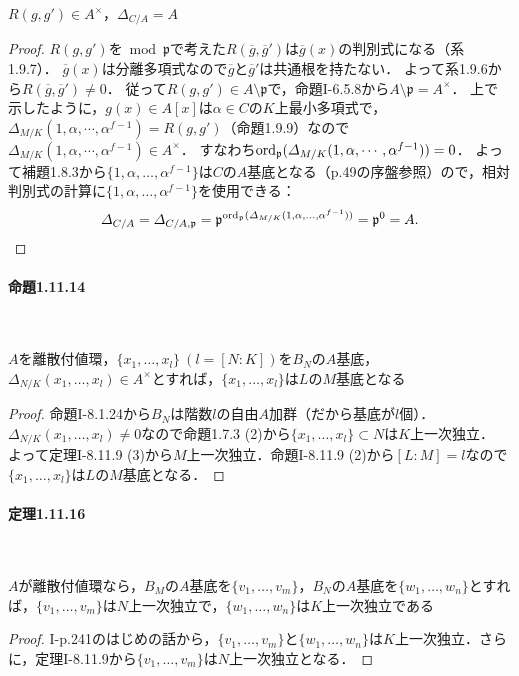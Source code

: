 \begin{screen}
  $R(g,g')\in A^\times$，$\varDelta_{C/A}=A$
\end{screen}
\begin{proof}
  $R(g,g')$を$\bmod\mathfrak{p}$で考えた$R(\overline{g},\overline{g}')$は$\overline{g}(x)$の判別式になる（系1.9.7）．
  $\overline{g}(x)$は分離多項式なので$\overline{g}$と$\overline{g}'$は共通根を持たない．
  よって系1.9.6から$R(\overline{g},\overline{g}')\neq 0$．
  従って$R(g,g')\in A\setminus\mathfrak{p}$で，命題I-6.5.8から$A\setminus\mathfrak{p}=A^\times$．
  上で示したように，$g(x)\in A[x]$は$\alpha\in C$の$K$上最小多項式で，$\varDelta_{M/K}(1,\alpha,\cdots,\alpha^{f-1}) = R(g,g')$（命題1.9.9）なので$\varDelta_{M/K}(1,\alpha,\cdots,\alpha^{f-1})\in A^\times$．
  すなわち$\operatorname{ord}_\mathfrak{p}(\varDelta_{M/K}(1,\alpha,\cdots,\alpha^{f-1}))=0$．
  よって補題1.8.3から$\{1,\alpha,\ldots,\alpha^{f-1}\}$は$C$の$A$基底となる（p.49の序盤参照）ので，相対判別式の計算に$\{1,\alpha,\ldots,\alpha^{f-1}\}$を使用できる：
  \[\varDelta_{C/A}=\varDelta_{C/A,\mathfrak{p}}=\mathfrak{p}^{\operatorname{ord}_\mathfrak{p}(\varDelta_{M/K}(1,\alpha,\ldots,\alpha^{f-1}))}=\mathfrak{p}^{0}=A.\]
\end{proof}

\paragraph{命題1.11.14}~
\begin{screen}
  $A$を離散付値環，$\{x_1,\ldots,x_l\}\ (l=[N:K])$を$B_N$の$A$基底，$\varDelta_{N/K}(x_1,\ldots,x_l)\in A^\times$とすれば，$\{x_1,\ldots,x_l\}$は$L$の$M$基底となる
\end{screen}
\begin{proof}
  命題I-8.1.24から$B_N$は階数$l$の自由$A$加群（だから基底が$l$個）．
  $\varDelta_{N/K}(x_1,\ldots,x_l)\neq 0$なので命題1.7.3 (2)から$\{x_1,\ldots,x_l\}\subset N$は$K$上一次独立．
  よって定理I-8.11.9 (3)から$M$上一次独立．命題I-8.11.9 (2)から$[L:M]=l$なので$\{x_1,\ldots,x_l\}$は$L$の$M$基底となる．
\end{proof}

\paragraph{定理1.11.16}~
\begin{screen}
  $A$が離散付値環なら，$B_M$の$A$基底を$\{v_1,\ldots,v_m\}$，$B_N$の$A$基底を$\{w_1,\ldots,w_n\}$とすれば，$\{v_1,\ldots,v_m\}$は$N$上一次独立で，$\{w_1,\ldots,w_n\}$は$K$上一次独立である
\end{screen}
\begin{proof}
  I-p.241のはじめの話から，$\{v_1,\ldots,v_m\}$と$\{w_1,\ldots,w_n\}$は$K$上一次独立．さらに，定理I-8.11.9から$\{v_1,\ldots,v_m\}$は$N$上一次独立となる．
\end{proof}

